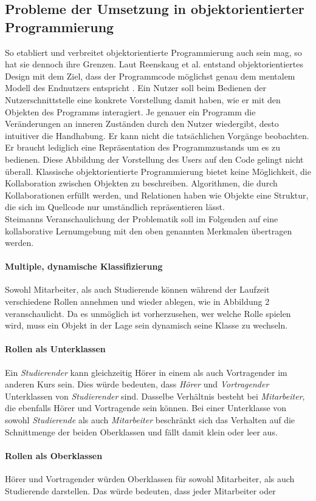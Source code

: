 \documentclass[conference]{IEEEtran}
\begin{document}
	
\subsection{Probleme der Umsetzung in objektorientierter Programmierung}  
So etabliert und verbreitet objektorientierte Programmierung auch sein mag, so hat sie dennoch ihre Grenzen. Laut Reenskaug et al. entstand objektorientiertes Design mit dem Ziel, dass der Programmcode möglichst genau dem mentalem Modell des Endnutzers entspricht \cite{reenskaug2009dci}. Ein Nutzer soll beim Bedienen der Nutzerschnittstelle eine konkrete Vorstellung damit haben, wie er mit den Objekten des Programms interagiert. Je genauer ein Programm die Veränderungen an inneren Zuständen durch den Nutzer wiedergibt, desto intuitiver die Handhabung. Er kann nicht die tatsächlichen Vorgänge beobachten. Er braucht lediglich eine Repräsentation des Programmzustands um es zu bedienen. Diese Abbildung der Vorstellung des Users auf den Code gelingt nicht überall. Klassische objektorientierte Programmierung bietet keine Möglichkeit, die Kollaboration zwischen Objekten zu beschreiben. Algorithmen, die durch Kollaborationen erfüllt werden, und Relationen haben wie Objekte eine Struktur, die sich im Quellcode nur umständlich repräsentieren lässt. \\Steimanns Veranschaulichung der Problematik soll im Folgenden auf eine kollaborative Lernumgebung mit den oben genannten Merkmalen übertragen werden\cite{steimann2000representation}.\paragraph{Multiple, dynamische Klassifizierung} Sowohl Mitarbeiter, als auch Studierende können während der Laufzeit verschiedene Rollen annehmen und wieder ablegen, wie in Abbildung 2 veranschaulicht. Da es unmöglich ist vorherzusehen, wer welche Rolle spielen wird, muss ein Objekt in der Lage sein dynamisch seine Klasse zu wechseln. \paragraph{Rollen als Unterklassen} Ein \textit{Studierender} kann gleichzeitig Hörer in einem als auch Vortragender im anderen Kurs sein. Dies würde bedeuten, dass \textit{Hörer} und \textit{Vortragender} Unterklassen von \textit{Studierender} sind. Dasselbe Verhältnis besteht bei \textit{Mitarbeiter}, die ebenfalls Hörer und Vortragende sein können. Bei einer Unterklasse von sowohl \textit{Studierende} als auch \textit{Mitarbeiter} beschränkt sich das Verhalten auf die Schnittmenge der beiden Oberklassen und fällt damit klein oder leer aus.\paragraph{Rollen als Oberklassen} Hörer und Vortragender würden Oberklassen für sowohl Mitarbeiter, als auch Studierende darstellen. Das würde bedeuten, dass jeder Mitarbeiter oder 
\end{document}
